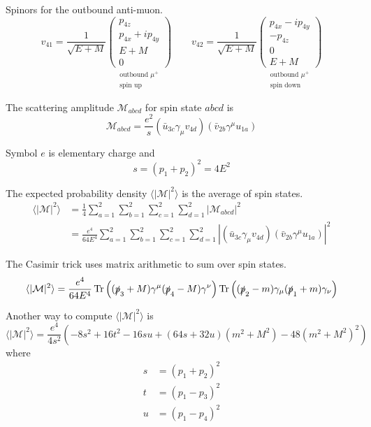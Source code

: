 Spinors for the outbound anti-muon.
\begin{equation*}
v_{41}=\frac{1}{\sqrt{E+M}}
\underset{\substack{\text{outbound $\mu^+$}\\ \text{spin up}}}
{\begin{pmatrix}p_{4z}\\p_{4x}+ip_{4y}\\E+M\\0\end{pmatrix}}
\qquad
v_{42}=\frac{1}{\sqrt{E+M}}
\underset{\substack{\text{outbound $\mu^+$}\\ \text{spin down}}}
{\begin{pmatrix}p_{4x}-ip_{4y}\\-p_{4z}\\0\\E+M\end{pmatrix}}
\end{equation*}

The scattering amplitude $\mathcal M_{abcd}$ for spin state $abcd$ is
\begin{equation*}
\mathcal{M}_{abcd}=\frac{e^2}{s}(\bar{u}_{3c}\gamma_\mu v_{4d})(\bar{v}_{2b}\gamma^\mu u_{1a})
\end{equation*}

Symbol $e$ is elementary charge and
\begin{equation*}
s=(p_1+p_2)^2=4E^2
\end{equation*}

The expected probability density $\langle|\mathcal{M}|^2\rangle$ is the average of spin states.
\begin{align*}
\langle|\mathcal{M}|^2\rangle
&=\frac{1}{4}\sum_{a=1}^2\sum_{b=1}^2\sum_{c=1}^2\sum_{d=1}^2\big|\mathcal{M}_{abcd}\big|^2
\\
&=\frac{e^4}{64E^4}\sum_{a=1}^2\sum_{b=1}^2\sum_{c=1}^2\sum_{d=1}^2
\left|(\bar{u}_{3c}\gamma_\mu v_{4d})(\bar{v}_{2b}\gamma^\mu u_{1a})\right|^2
\end{align*}

The Casimir trick uses matrix arithmetic to sum over spin states.
\begin{equation*}
\langle|\mathcal{M}|^2\rangle
=\frac{e^4}{64E^4}
\mathop{\rm Tr}\left((\slashed{p}_3+M)\gamma^\mu(\slashed{p}_4-M)\gamma^\nu\right)
\mathop{\rm Tr}\left((\slashed{p}_2-m)\gamma_\mu(\slashed{p}_1+m)\gamma_\nu\right)
\end{equation*}

\iffalse

Another way to compute $\langle|\mathcal{M}|^2\rangle$ is
\begin{equation*}
\langle|\mathcal{M}|^2\rangle
=\frac{e^4}{4s^2}
\left(-8 s^2 + 16 t^2 - 16 s u + (64 s + 32 u) \left(m^2 + M^2\right) - 48 \left(m^2 + M^2\right)^2\right)
\end{equation*}
where
\begin{align*}
s&=(p_1+p_2)^2
\\
t&=(p_1-p_3)^2
\\
u&=(p_1-p_4)^2
\end{align*}

